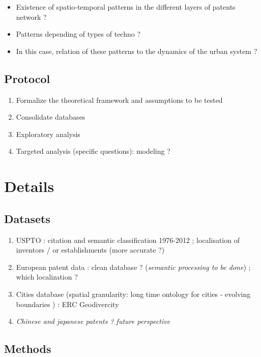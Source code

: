 \begin{itemize}
	\item Existence of spatio-temporal patterns in the different layers of patents network ?
	\item Patterns depending of types of techno ?
	\item In this case, relation of these patterns to the dynamics of the urban system ?
\end{itemize}



\subsection{Protocol}


\begin{enumerate}
	\item Formalize the theoretical framework and assumptions to be tested
	\item Consolidate databases
	\item Exploratory analysis
	\item Targeted analysis (specific questions): modeling ?
\end{enumerate}



\section{Details}


\subsection{Datasets}

\begin{enumerate}
	\item USPTO : citation and semantic classification 1976-2012 \cite{bergeaud2017classifying} ; localisation of inventors / or establishments (more accurate ?) \cite{li2014disambiguation}
	\item European patent data : clean database ? (\textit{semantic processing to be done}) ; which localization ?
	\item Cities database (spatial granularity: long time ontology for cities - evolving boundaries \cite{bretagnolle2009villes}) : ERC Geodivercity
	\item \textit{Chinese and japanese patents ? future perspective}
\end{enumerate}


\subsection{Methods}

